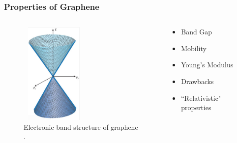 \documentclass{beamer}
\begin{document}
\begin{frame}
\frametitle{Properties of Graphene}
\begin{columns}
	\begin{column}{0.48\textwidth}
	\begin{figure}
		\includegraphics[height=5cm, width=3.25cm]{../present_figs/graphenebandgap}
		\caption{Electronic band structure of graphene \cite{Fuhrer2010}.}
	\end{figure}
	\end{column}
	\begin{column}{0.48\textwidth}
		\begin{itemize}
            \item Band Gap
            \item Mobility
            \item Young's Modulus
            \item Drawbacks
            \item ``Relativistic" properties
        \end{itemize}
	\end{column}
\end{columns}
\end{frame}
\end{document}
